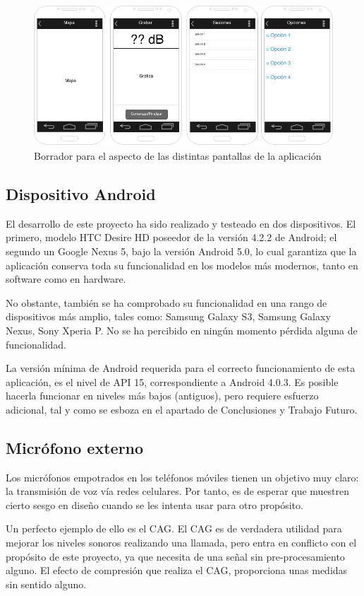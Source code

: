 \begin{figure}[h] \centering
    \includegraphics[width=15cm]{graphs/mockup.png} \caption{Borrador para el aspecto de las distintas pantallas de la aplicación}\label{fig:mockup}
\end{figure}
\subsection{Dispositivo Android}
    El desarrollo de este proyecto ha sido realizado y testeado en dos dispositivos. El primero, modelo HTC Desire HD poseedor de la versión 4.2.2 de Android; el segundo un Google Nexus 5, bajo la versión Android 5.0, lo cual garantiza que la aplicación conserva toda su funcionalidad en los modelos más modernos, tanto en software como en hardware. 

    No obstante, también se ha comprobado su funcionalidad en una rango de dispositivos más amplio, tales como: Samsung Galaxy S3, Samsung Galaxy Nexus, Sony Xperia P. No se ha percibido en ningún momento pérdida alguna de funcionalidad. 

    La versión mínima de Android requerida para el correcto funcionamiento de esta aplicación, es el nivel de \ac{API} 15, correspondiente a Android 4.0.3. Es posible hacerla funcionar en niveles más bajos (antiguos), pero requiere esfuerzo adicional, tal y como se esboza en el apartado de Conclusiones y Trabajo Futuro.

\subsection{Micrófono externo}
    Los micrófonos empotrados en los teléfonos móviles tienen un objetivo muy claro: la transmisión de voz vía redes celulares. Por tanto, es de esperar que muestren cierto sesgo en diseño cuando se les intenta usar para otro propósito.

    Un perfecto ejemplo de ello es el \ac{CAG}. El \ac{CAG} es de verdadera utilidad para mejorar los niveles sonoros realizando una llamada, pero entra en conflicto con el propósito de este proyecto, ya que necesita de una señal sin pre-procesamiento alguno. El efecto de compresión que realiza el \ac{CAG}, proporciona unas medidas sin sentido alguno.

